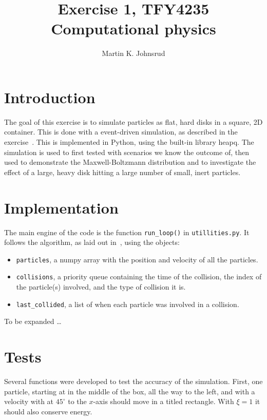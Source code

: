 \documentclass{article}
\title{Exercise 1, TFY4235 Computational physics}
\author{Martin K. Johnsrud}
\date{}
\begin{document}
    \maketitle
    \section*{Introduction}
        The goal of this exercise is to simulate particles as flat, hard disks in a square, 2D container. This is done with a event-driven simulation, as described in the exercise~\cite{exercise}. This is implemented in Python, using the built-in library heapq. The simulation is used to first tested with scenarios we know the outcome of, then used to demonstrate the Maxwell-Boltzmann distribution and to investigate the effect of a large, heavy disk hitting a large number of small, inert particles.
    
    \section*{Implementation}
        The main engine of the code is the function \verb|run_loop()| in \verb|utillities.py|. It follows the algorithm, as laid out in~\cite{exercise}, using the objects:
        \begin{itemize}
            \item \verb|particles|, a numpy array with the position and velocity of all the particles.
            \item \verb|collisions|, a priority queue containing the time of the collision, the index of the particle(s) involved, and the type of collision it is.
            \item \verb|last_collided|, a list of when each particle was involved in a collision.
        \end{itemize}
        To be expanded \dots

    \section*{Tests}
    Several functions were developed to test the accuracy of the simulation. First, one particle, starting at in the middle of the box, all the way to the left, and with a velocity with at $45^\circ$ to the $x$-axis should move in a titled rectangle. With $\xi=1$ it should also conserve energy.
\end{document}
